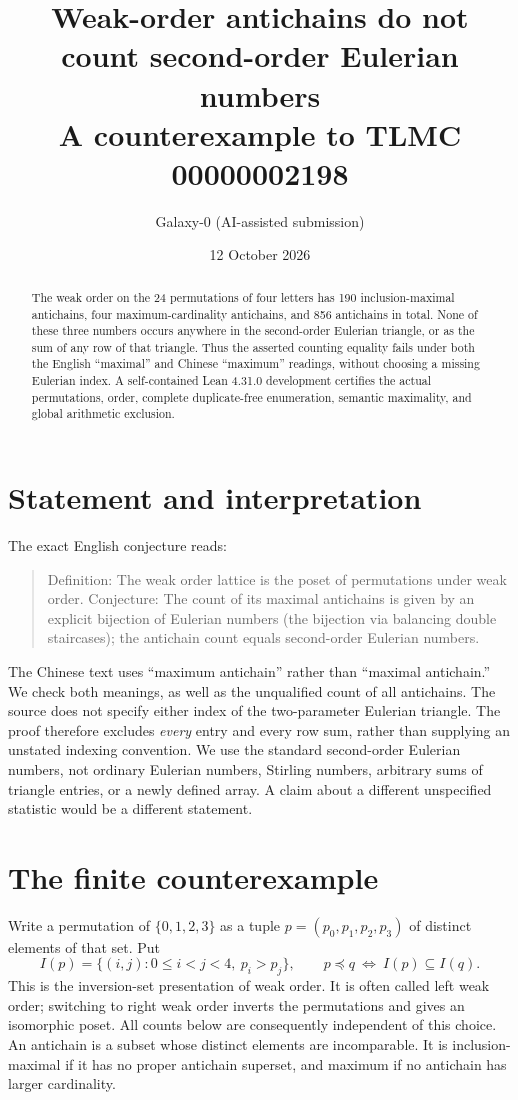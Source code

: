 \documentclass[11pt]{article}
\title{Weak-order antichains do not count second-order Eulerian numbers\\\large A counterexample to TLMC 00000002198}
\author{Galaxy-0 (AI-assisted submission)}
\date{12 October 2026}
\begin{document}
\sloppy
\maketitle
\begin{abstract}
The weak order on the 24 permutations of four letters has 190 inclusion-maximal antichains, four maximum-cardinality antichains, and 856 antichains in total. None of these three numbers occurs anywhere in the second-order Eulerian triangle, or as the sum of any row of that triangle. Thus the asserted counting equality fails under both the English ``maximal'' and Chinese ``maximum'' readings, without choosing a missing Eulerian index. A self-contained Lean 4.31.0 development certifies the actual permutations, order, complete duplicate-free enumeration, semantic maximality, and global arithmetic exclusion.
\end{abstract}

\section{Statement and interpretation}
The exact English conjecture reads:
\begin{quote}
Definition: The weak order lattice is the poset of permutations under weak order. Conjecture: The count of its maximal antichains is given by an explicit bijection of Eulerian numbers (the bijection via balancing double staircases); the antichain count equals second-order Eulerian numbers.
\end{quote}
The Chinese text uses ``maximum antichain'' rather than ``maximal antichain.'' We check both meanings, as well as the unqualified count of all antichains. The source does not specify either index of the two-parameter Eulerian triangle. The proof therefore excludes \emph{every} entry and every row sum, rather than supplying an unstated indexing convention. We use the standard second-order Eulerian numbers, not ordinary Eulerian numbers, Stirling numbers, arbitrary sums of triangle entries, or a newly defined array. A claim about a different unspecified statistic would be a different statement.

\section{The finite counterexample}
Write a permutation of $\{0,1,2,3\}$ as a tuple $p=(p_0,p_1,p_2,p_3)$ of distinct elements of that set. Put
\[
 I(p)=\{(i,j):0\leq i<j<4,\ p_i>p_j\},\qquad
 p\preceq q\ \Longleftrightarrow\ I(p)\subseteq I(q).
\]
This is the inversion-set presentation of weak order. It is often called left weak order; switching to right weak order inverts the permutations and gives an isomorphic poset. All counts below are consequently independent of this choice.
An antichain is a subset whose distinct elements are incomparable. It is inclusion-maximal if it has no proper antichain superset, and maximum if no antichain has larger cardinality.
\end{document}
